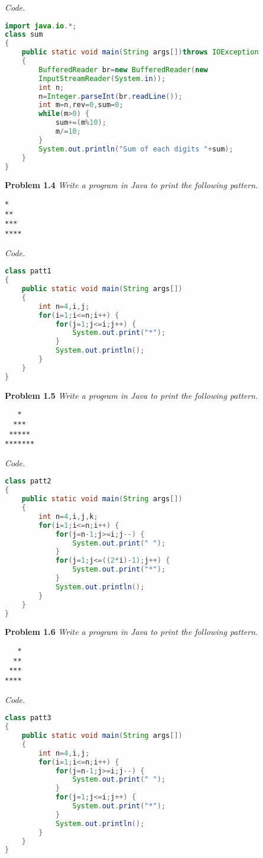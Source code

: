 \documentclass[12pt]{article}
\begin{document}
\textit{Code.}

\begin{lstlisting}[language=Java]
import java.io.*;
class sum
{
	public static void main(String args[])throws IOException
	{
		BufferedReader br=new BufferedReader(new 
		InputStreamReader(System.in));
		int n;
		n=Integer.parseInt(br.readLine());
		int m=n,rev=0,sum=0;
		while(m>0) {
			sum+=(m%10);
			m/=10;
		}
		System.out.println("Sum of each digits "+sum);
	}
}
\end{lstlisting}

\textbf{Problem 1.4} \textit{Write a program in Java to print the following pattern.}

\begin{lstlisting}
*
**
***
****
\end{lstlisting}

\textit{Code.}

\begin{lstlisting}[language=Java]
class patt1
{
	public static void main(String args[])
	{
		int n=4,i,j;
		for(i=1;i<=n;i++) {
			for(j=1;j<=i;j++) {
				System.out.print("*");
			}
			System.out.println();
		}
	}
}
\end{lstlisting}

\textbf{Problem 1.5} \textit{Write a program in Java to print the following pattern.}

\begin{lstlisting}
   *
  ***
 *****
*******
\end{lstlisting}

\textit{Code.}

\begin{lstlisting}[language=Java]
class patt2
{
	public static void main(String args[])
	{
		int n=4,i,j,k;
		for(i=1;i<=n;i++) {
			for(j=n-1;j>=i;j--) {
				System.out.print(" ");
			}
			for(j=1;j<=((2*i)-1);j++) {
				System.out.print("*");
			}
			System.out.println();
		}
	}
}
\end{lstlisting}


\textbf{Problem 1.6} \textit{Write a program in Java to print the following pattern.}

\begin{lstlisting}
   *
  **
 ***
****
\end{lstlisting}

\textit{Code.}

\begin{lstlisting}[language=Java]
class patt3
{
	public static void main(String args[])
	{
		int n=4,i,j;
		for(i=1;i<=n;i++) {
			for(j=n-1;j>=i;j--) {
				System.out.print(" ");
			}
			for(j=1;j<=i;j++) {
				System.out.print("*");
			}
			System.out.println();
		}
	}
}
\end{lstlisting}
\end{document}
